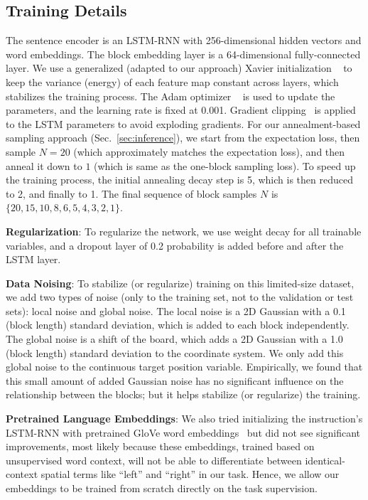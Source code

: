 \documentclass[letterpaper]{article} %
\begin{document}
\subsection{Training Details}
\label{sec:trainingdetails}
The sentence encoder is an LSTM-RNN with 256-dimensional hidden vectors and word embeddings. The block embedding layer is a 64-dimensional fully-connected layer. We use a generalized (adapted to our approach) Xavier initialization ~\cite{glorot2010understanding} to keep the variance (energy) of each feature map constant across layers, which stabilizes the training process. The Adam optimizer ~\cite{kingma2014adam} is used to update the parameters, and the learning rate is fixed at 0.001. Gradient clipping~\cite{pascanu2013difficulty} is applied to the LSTM parameters to avoid exploding gradients.
For our annealment-based sampling approach (Sec.~\ref{sec:inference}), we start from the expectation loss, then sample $N=20$ (which approximately matches the expectation loss), and then anneal it down to $1$ (which is same as the one-block sampling loss). To speed up the training process, the initial annealing decay step is 5, which is then reduced to 2, and finally to 1. The final sequence of block samples $N$ is $\{20, 15, 10, 8, 6, 5, 4, 3, 2, 1\}$.


\textbf{Regularization}: To regularize the network, we use weight decay for all trainable variables, and a dropout layer of 0.2 probability is added before and after the LSTM layer.

\textbf{Data Noising}: To stabilize (or regularize) training on this limited-size dataset, we add two types of noise (only to the training set, not to the validation or test sets): local noise and global noise. The local noise is a 2D Gaussian with a 0.1 (block length) standard deviation, which is added to each block independently. The global noise is a shift of the board, which adds a 2D Gaussian with a 1.0 (block length) standard deviation to the coordinate system. We only add this global noise to the continuous target position variable. Empirically, we found that this small amount of added Gaussian noise has no significant influence on the relationship between the blocks;
but it helps stabilize (or regularize) the training.

\textbf{Pretrained Language Embeddings}: We also tried initializing the instruction's LSTM-RNN with pretrained GloVe word embeddings~\cite{pennington2014glove} but did not see significant improvements, most likely because these embeddings, trained based on unsupervised word context, will not be able to differentiate between identical-context spatial terms like ``left'' and ``right'' in our task. Hence, we allow our embeddings to be trained from scratch directly on the task supervision.
\end{document}
